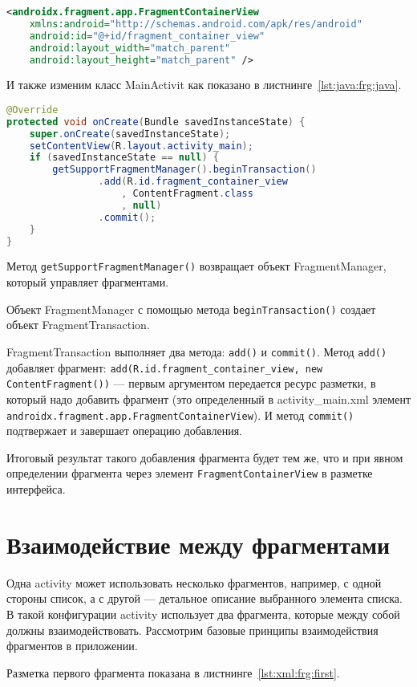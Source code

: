 \begin{lstlisting}[language=XML
	, caption=\leftline{}
	, label=lst:xml:frg:java
	]
<androidx.fragment.app.FragmentContainerView
	xmlns:android="http://schemas.android.com/apk/res/android"
	android:id="@+id/fragment_container_view"
	android:layout_width="match_parent"
	android:layout_height="match_parent" />
\end{lstlisting}

И также изменим класс MainActivit как показано
в листнинге~\ref{lst:java:frg:java}.

\begin{lstlisting}[language=Java
	, caption=\leftline{Реализация фаргмента в Java коде}
	, label=lst:java:frg:java
	]
@Override
protected void onCreate(Bundle savedInstanceState) {
	super.onCreate(savedInstanceState);
	setContentView(R.layout.activity_main);
	if (savedInstanceState == null) {
		getSupportFragmentManager().beginTransaction()
				.add(R.id.fragment_container_view
					, ContentFragment.class
					, null)
				.commit();
	}
}
\end{lstlisting}

Метод \texttt{getSupportFragmentManager()} возвращает объект FragmentManager,
который управляет фрагментами.\par
Объект FragmentManager с помощью метода \texttt{beginTransaction()} создает
объект FragmentTransaction.\par
FragmentTransaction выполняет два метода: \texttt{add()} и \texttt{commit()}.
Метод \texttt{add()} добавляет фрагмент:
\texttt{add(R.id.fragment\_container\_view, new 
ContentFragment())} --- первым аргументом передается ресурс разметки, в
который надо добавить фрагмент (это определенный в activity\_main.xml
элемент \texttt{androidx.fragment.app.FragmentContainerView}).
И метод \texttt{commit()} подтвержает и завершает операцию добавления.\par
Итоговый результат такого добавления фрагмента будет тем же, что и при
явном определении фрагмента через элемент \texttt{FragmentContainerView} в
разметке интерфейса.

\section{Взаимодействие между фрагментами}
Одна activity может использовать несколько фрагментов, например, с одной
стороны список, а с другой --- детальное описание выбранного элемента
списка. В такой конфигурации activity использует два фрагмента, которые
между собой должны взаимодействовать. Рассмотрим базовые принципы
взаимодействия фрагментов в приложении.\par
Разметка первого фрагмента показана в листнинге~\ref{lst:xml:frg:first}.


